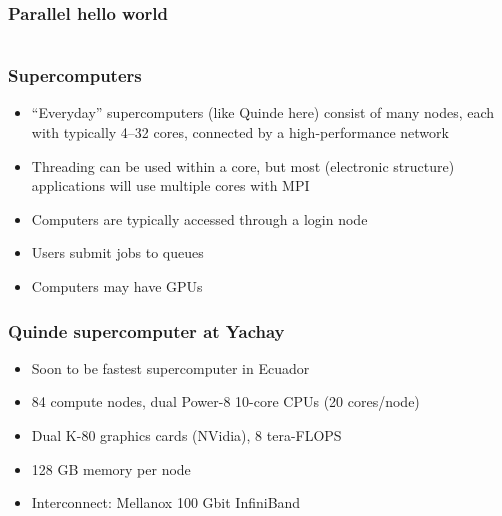 \documentclass[usenames,dvipsnames,mathserif,compress]{beamer}
\begin{document}
\begin{frame}[fragile]
  \frametitle{Parallel hello world}
  
\end{frame}

\begin{frame}[fragile]
  \begin{columns}
    \begin{column}{1.05\textwidth}
  
    \end{column}
  \end{columns}
\end{frame}

\begin{frame}
  \frametitle{Supercomputers}
  \begin{itemize}
  \item ``Everyday'' supercomputers (like Quinde here) consist of many nodes, each with typically 4--32 cores, connected by a high-performance network
  \item Threading can be used within a core, but most (electronic structure)
    applications will use multiple cores with MPI
  \item Computers are typically accessed through a login node
  \item Users submit jobs to queues
  \item Computers may have GPUs
  \end{itemize}
\end{frame}

\begin{frame}
  \frametitle{Quinde supercomputer at Yachay}
  \begin{itemize}
  \item Soon to be fastest supercomputer in Ecuador
  \item 84 compute nodes, dual Power-8 10-core CPUs (20 cores/node)
  \item Dual K-80 graphics cards (NVidia), 8 tera-FLOPS
  \item 128 GB memory per node
  \item Interconnect: Mellanox 100 Gbit InfiniBand
  \end{itemize}
\end{frame}
\end{document}
